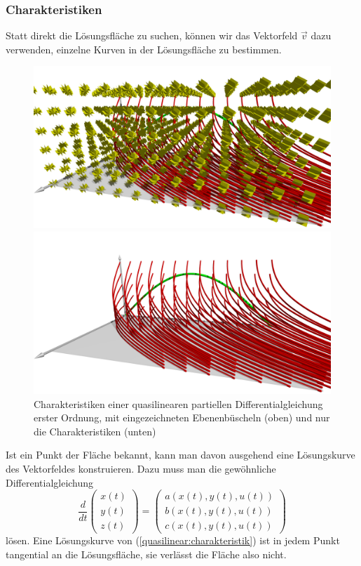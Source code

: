 \subsubsection{Charakteristiken}
Statt direkt die Lösungsfläche zu suchen, können wir das Vektorfeld
$\vec v$ dazu verwenden, einzelne Kurven in der Lösungsfläche
zu bestimmen.
\begin{figure}
\begin{center}
\includegraphics[width=\hsize]{3d/chrpl.jpg}
\end{center}
\begin{center}
\includegraphics[width=\hsize]{3d/chr.jpg}
\end{center}
\caption{Charakteristiken einer quasilinearen partiellen Differentialgleichung
erster Ordnung, mit eingezeichneten Ebenenbüscheln (oben) und nur die
Charakteristiken (unten)\label{geometrie:charekeristiken-mit-buescheln}}
\end{figure}
Ist ein Punkt der Fläche bekannt,
kann man davon ausgehend eine Lösungskurve des Vektorfeldes konstruieren.
Dazu muss man die gewöhnliche Differentialgleichung
\begin{equation}
\frac{d}{dt}\begin{pmatrix}x(t)\\y(t)\\z(t)\end{pmatrix}
=
\begin{pmatrix}
a(x(t),y(t),u(t))\\b(x(t),y(t),u(t))\\c(x(t),y(t),u(t))
\end{pmatrix}
\label{quasilinear:charakteristik}
\end{equation}
lösen.
Eine Lösungskurve von (\ref{quasilinear:charakteristik}) ist in jedem
Punkt tangential an die Lösungsfläche, sie verlässt die Fläche also
nicht.

